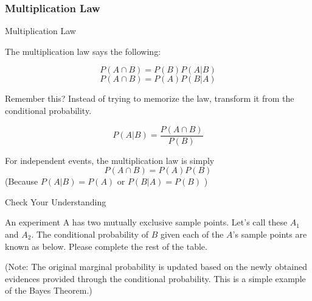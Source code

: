 \documentclass{beamer}
\begin{document}
\subsubsection{Multiplication Law}
\begin{frame}{Multiplication Law}

The multiplication law says the following: 

$$P(A \cap B) = P(B)P(A|B)$$
$$P(A \cap B) = P(A)P(B|A)$$

\begin{small}
Remember this? Instead of trying to memorize the law, transform it from the conditional probability.
\end{small}

$$P(A|B) = \frac{P(A\cap B)}{P(B)} $$

For independent events, the multiplication law is simply
$$P(A \cap B) = P(A)P(B) $$ 
(Because $P(A|B) = P(A)$ or $P(B|A) = P(B)$ )

\end{frame}


\begin{frame}{Check Your Understanding}

An experiment A has two mutually exclusive sample points. Let's call these $A_1$ and $A_2$. The conditional probability of $B$ given each of the $A$'s sample points are known as below. Please complete the rest of the table. 


\begin{table}[]
\end{table}
\begin{flushright}
\begin{scriptsize}
(Note: The original marginal probability is updated based on the newly obtained evidences provided through the conditional probability. This is a simple example of the Bayes Theorem.) 
\end{scriptsize}
\end{flushright}



\end{frame}
\end{document}
